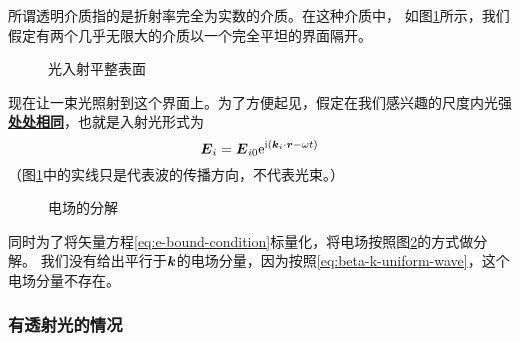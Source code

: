 \documentclass[UTF8, a4paper]{ctexart}
\newcommand*{\ii}{\mathrm{i}}
\newcommand*{\ee}{\mathrm{e}}
\newcommand*{\concept}[1]{\underline{\textbf{#1}}}
\begin{document}
所谓透明介质指的是折射率完全为实数的介质。在这种介质中，
如图\ref{fig:ray-onto-flat-surface}所示，我们假定有两个几乎无限大的介质以一个完全平坦的界面隔开。
\begin{figure}
    \centering
    \caption{光入射平整表面}
    \label{fig:ray-onto-flat-surface}
\end{figure}
现在让一束光照射到这个界面上。为了方便起见，假定在我们感兴趣的尺度内光强\concept{处处相同}，也就是入射光形式为
\[
    \vb*{E}_i = \vb*{E}_{i0} \ee^{\ii(\vb*{k}_i \cdot \vb*{r} - \omega t)}
\]
（图\ref{fig:ray-onto-flat-surface}中的实线只是代表波的传播方向，不代表光束。）

\begin{figure}
    \centering
    \caption{电场的分解}
    \label{fig:decomposition-of-e}
\end{figure}

同时为了将矢量方程\eqref{eq:e-bound-condition}标量化，将电场按照图\ref{fig:decomposition-of-e}的方式做分解。
我们没有给出平行于$\vb*{k}$的电场分量，因为按照\eqref{eq:beta-k-uniform-wave}，这个电场分量不存在。

\subsubsection{有透射光的情况}
\end{document}
